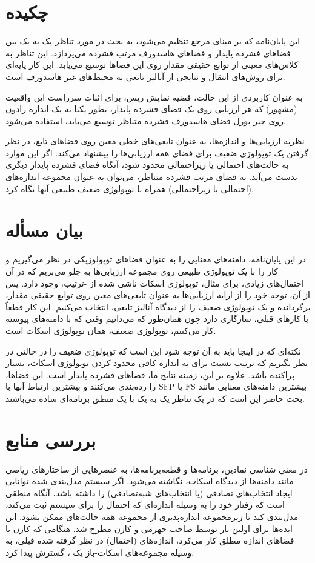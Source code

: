 \documentclass[12pt,a4paper]{article}
\theoremstyle{definition}
\theoremstyle{theorem}
\theoremstyle{definition}
\begin{document}
\section{چکیده }
این پایان‌نامه که بر مبنای مرجع 
\cite{alvarez}
تنظیم می‌شود، به بحث در مورد تناظر یک ‌به ‌یک بین فضاهای فشرده پایدار و فضاهای هاسدورف مرتب فشرده می‌پردازد. این تناظر به کلاس‌های معینی از توابع حقیقی مقدار روی این فضاها توسیع می‌یابد. این کار پایه‌ای برای روش‌های انتقال و نتایجی از آنالیز تابعی به محیط‌های غیر هاسدورف است.

به عنوان کاربردی از این حالت،  قضیه نمایش ریس، برای اثبات سرراست این واقعیت (مشهور) که هر ارزیابی روی یک فضای فشرده پایدار، بطور یکتا به یک اندازه رادون روی جبر بورل فضای هاسدورف فشرده متناظر توسیع می‌یابد، استفاده می‌شود.
 
 نظریه ارزیابی‌ها و اندازه‌ها، به عنوان تابعی‌های خطی معین روی فضاهای تابع، در نظر گرفتن یک توپولوژی ضعیف برای فضای همه ارزیابی‌ها را پیشنهاد می‌کند. اگر این موارد به حالت‌های احتمالی یا زیراحتمالی محدود شود، آنگاه فضای فشرده پایدار دیگری بدست می‌آید. به فضای مرتب فشرده متناظر، می‌توان به عنوان مجموعه اندازه‌های (احتمالی یا زیراحتمالی) همراه با توپولوژی ضعیف طبیعی آنها نگاه کرد. 
\section{ بیان مسأله}
در این پایان‌نامه، دامنه‌های معنایی را به عنوان فضاهای توپولوژیکی در نظر می‌گیریم و کار را با یک توپولوژی طبیعی روی مجموعه ارزیابی‌ها به جلو می‌بریم که در آن احتمال‌های زیادی، برای مثال، توپولوژی اسکات ناشی شده از 
%
-ترتیب، وجود دارد. پس از آن، توجه خود را از ارایه ارزیابی‌ها به عنوان تابعی‌های معین روی توابع حقیقی مقدار، برگردانده و یک توپولوژی ضعیف را از دیدگاه آنالیز تابعی، انتخاب می‌کنیم. این کار قطعاً با کارهای قبلی، سازگاری دارد چون همان‌طور که می‌دانیم وقتی که با دامنه‌های پیوسته کار می‌کنیم، توپولوژی ضعیف، همان توپولوژی اسکات است. 

نکته‌ای که در اینجا باید به آن توجه شود این است که توپولوژی ضعیف را در حالتی در نظر بگیریم که ترتیب-نسبت برای به اندازه کافی محدود کردن توپولوژی اسکات، بسیار پراکنده باشد. علاوه بر این، زمینه نتایج ما، فضاهای فشرده پایدار است. این فضاها، بیشترین دامنه‌های معنایی مانند 
$\mathrm{FS}  $
یا
$ \mathrm{SFP} $
 را رده‌بندی می‌کنند و بیشترین ارتباط آنها با بحث حاضر این است که در یک تناظر یک به یک با یک منطق برنامه‌ای ساده می‌باشند.
\section{ بررسی منابع } 
در معنی شناسی نمادین، برنامه‌ها و قطعه‌برنامه‌ها، به عنصرهایی از ساختارهای ریاضی مانند دامنه‌ها از دیدگاه اسکات، نگاشته می‌شود. اگر سیستم مدل‌بندی شده توانایی ایجاد انتخاب‌های تصادفی (یا انتخاب‌های شبه‌تصادفی) را داشته باشد، آنگاه منطقی است که رفتار خود را به وسیله اندازه‌ای که احتمال را برای سیستم ثبت می‌کند، مدل‌بندی کند تا زیرمجموعه‌ اندازه‌پذیری از مجموعه همه حالت‌های ممکن بشود. این ایده‌ها برای اولین بار توسط صاحب ‌جهرمی\cite{saheb} و کازن\cite{kozen}
مطرح شد. هنگامی که کازن با فضاهای اندازه مطلق کار می‌کرد، اندازه‌های (احتمال) در نظر گرفته شده قبلی، به وسیله مجموعه‌های اسکات-باز یک ، گسترش پیدا کرد.
\end{document}
